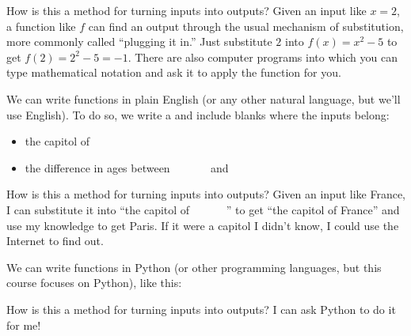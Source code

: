 \documentclass[letterpaper,10pt,english]{sphinxmanual}
\begin{document}
How is this a method for turning inputs into outputs?  Given an input like \(x=2\), a function like \(f\) can find an output through the usual mechanism of substitution, more commonly called “plugging it in.”  Just substitute \(2\) into \(f(x)=x^2-5\) to get \(f(2)=2^2-5=-1\).  There are also computer programs into which you can type mathematical notation and ask it to apply the function for you.

 We can write functions in plain English (or any other natural language, but we’ll use English).  To do so, we write a  and include blanks where the inputs belong:
\begin{itemize}
\item {} 
the capitol of        

\item {} 
the difference in ages between         and        

\end{itemize}

How is this a method for turning inputs into outputs?  Given an input like France, I can substitute it into “the capitol of        ” to get “the capitol of France” and use my knowledge to get Paris.  If it were a capitol I didn’t know, I could use the Internet to find out.

 We can write functions in Python (or other programming languages, but this course focuses on Python), like this:

\begin{sphinxVerbatim}[commandchars=\\\{\}]
    
     

    
       
\end{sphinxVerbatim}

How is this a method for turning inputs into outputs?  I can ask Python to do it for me!

\begin{sphinxVerbatim}[commandchars=\\\{\}]
\end{sphinxVerbatim}
\end{document}
